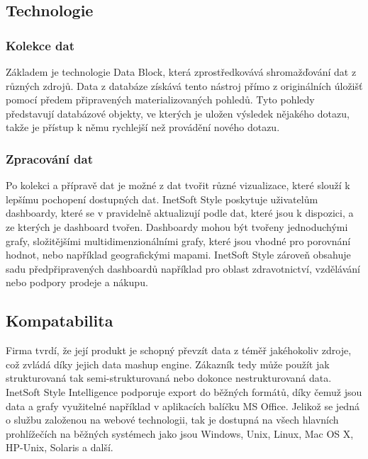 \documentclass[czech,BP]{thesiskiv}
\begin{document}
\subsection{Technologie}
\subsubsection{Kolekce dat}
Základem je technologie Data Block\texttrademark, která zprostředkovává shromažďování dat z různých zdrojů. Data z databáze získává tento nástroj přímo z originálních úložišť pomocí předem připravených materializovaných pohledů. Tyto pohledy představují databázové objekty, ve kterých je uložen výsledek nějakého dotazu, takže je přístup k němu rychlejší než provádění nového dotazu.

\subsubsection{Zpracování dat}
Po kolekci a přípravě dat je možné z dat tvořit různé vizualizace, které slouží k lepšímu pochopení dostupných dat. InetSoft Style poskytuje uživatelům dashboardy, které se v pravidelně aktualizují podle dat, které jsou k dispozici, a ze kterých je dashboard tvořen. Dashboardy mohou být tvořeny jednoduchými grafy, složitějšími multidimenzionálními grafy, které jsou vhodné pro porovnání hodnot, nebo například geografickými mapami. InetSoft Style zároveň obsahuje sadu předpřipravených dashboardů například pro oblast zdravotnictví, vzdělávání nebo podpory prodeje a nákupu. 


\subsection{Kompatabilita}
Firma tvrdí, že její produkt je schopný převzít data z téměř jakéhokoliv zdroje, což zvládá díky jejich data mashup engine. Zákazník tedy může použít jak strukturovaná tak semi-strukturovaná nebo dokonce nestrukturovaná data. InetSoft Style Intelligence podporuje export do běžných formátů, díky čemuž jsou data a grafy využitelné například v aplikacích balíčku MS Office. Jelikož se jedná o službu založenou na webové technologii, tak je dostupná na všech hlavních prohlížečích na běžných systémech jako jsou Windows, Unix, Linux, Mac OS X, HP-Unix, Solaris a další.\cite{InetKompatilbilita}
\end{document}
